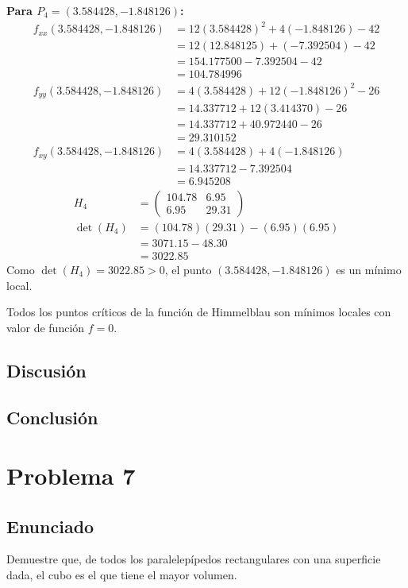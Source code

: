 \documentclass{article}
\begin{document}
\textbf{Para $P_4 = (3.584428, -1.848126)$:}
\begin{align}
f_{xx}(3.584428, -1.848126) &= 12(3.584428)^2 + 4(-1.848126) - 42 \\
&= 12(12.848125) + (-7.392504) - 42 \\
&= 154.177500 - 7.392504 - 42 \\
&= 104.784996 \\
f_{yy}(3.584428, -1.848126) &= 4(3.584428) + 12(-1.848126)^2 - 26 \\
&= 14.337712 + 12(3.414370) - 26 \\
&= 14.337712 + 40.972440 - 26 \\
&= 29.310152 \\
f_{xy}(3.584428, -1.848126) &= 4(3.584428) + 4(-1.848126) \\
&= 14.337712 - 7.392504 \\
&= 6.945208
\end{align}
\begin{align}
H_4 &= \begin{pmatrix} 104.78 & 6.95 \\ 6.95 & 29.31 \end{pmatrix} \\
\det(H_4) &= (104.78)(29.31) - (6.95)(6.95) \\
&= 3071.15 - 48.30 \\
&= 3022.85
\end{align}
Como $\det(H_4) = 3022.85 > 0$, el punto $(3.584428, -1.848126)$ es un mínimo local.

Todos los puntos críticos de la función de Himmelblau son mínimos locales con valor de función $f = 0$.

\subsection{Discusión}

\subsection{Conclusión}

\section{Problema 7}

\subsection{Enunciado}
Demuestre que, de todos los paralelepípedos rectangulares con una superficie dada, el cubo es el que tiene el mayor volumen.
\end{document}

